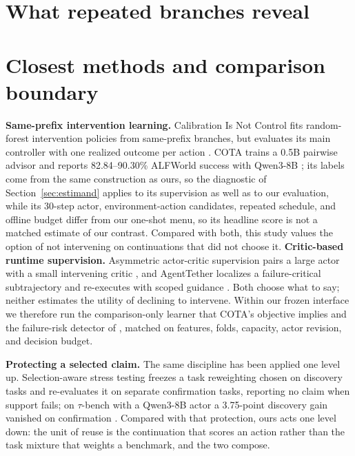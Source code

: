 \documentclass{article}
\begin{document}
\section{What repeated branches reveal}
\label{sec:analysis}




\section{Closest methods and comparison boundary}

\textbf{Same-prefix intervention learning.} Calibration Is Not Control fits random-forest intervention policies from same-prefix branches, but evaluates its main controller with one realized outcome per action \citep{zhang2026calibration}. COTA trains a 0.5B pairwise advisor and reports 82.84--90.30\% ALFWorld success with Qwen3-8B \citep{jiang2026cota}; its labels come from the same construction as ours, so the diagnostic of Section~\ref{sec:estimand} applies to its supervision as well as to our evaluation, while its 30-step actor, environment-action candidates, repeated schedule, and offline budget differ from our one-shot menu, so its headline score is not a matched estimate of our contrast. Compared with both, this study values the option of not intervening on continuations that did not choose it. \textbf{Critic-based runtime supervision.} Asymmetric actor-critic supervision pairs a large actor with a small intervening critic \citep{jiang2026asymac}, and AgentTether localizes a failure-critical subtrajectory and re-executes with scoped guidance \citep{zhao2026agenttether}. Both choose what to say; neither estimates the utility of declining to intervene. Within our frozen interface we therefore run the comparison-only learner that COTA's objective implies and the failure-risk detector of \citet{vasudev2026failure}, matched on features, folds, capacity, actor revision, and decision budget.

\textbf{Protecting a selected claim.} The same discipline has been applied one level up. Selection-aware stress testing freezes a task reweighting chosen on discovery tasks and re-evaluates it on separate confirmation tasks, reporting no claim when support fails; on $\tau$-bench with a Qwen3-8B actor a 3.75-point discovery gain vanished on confirmation \citep{xu2026sasst}. Compared with that protection, ours acts one level down: the unit of reuse is the continuation that scores an action rather than the task mixture that weights a benchmark, and the two compose.
\end{document}
